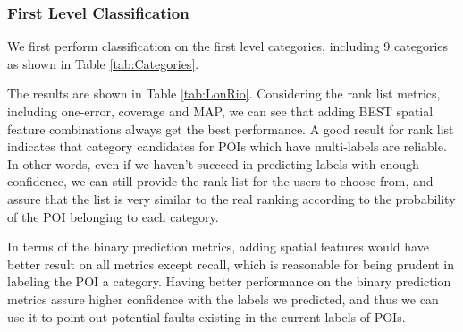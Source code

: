 \subsubsection{ First Level Classification}
%



We first perform classification on the first level categories,
including 9 categories as shown in Table \ref{tab:Categories}.

The results are shown in Table \ref{tab:LonRio}. Considering the rank list metrics,
including one-error, coverage and MAP, we can see that adding BEST spatial feature
combinations always get the best performance. A good result for rank list indicates
that category candidates for POIs which have multi-labels are reliable.
In other words, even if we haven't succeed in predicting labels with
enough confidence, we can still provide the rank list for the users
to choose from, and assure that the list is very similar to the real ranking
according to the probability of the POI belonging to each category.


In terms of the binary prediction metrics,
adding spatial features would have better result
on all metrics except recall, which is reasonable for
being prudent in labeling the POI a category.
Having better performance on the binary prediction metrics
assure higher confidence with the labels we predicted,
and thus we can use it to point out potential faults
existing in the current labels of POIs.


